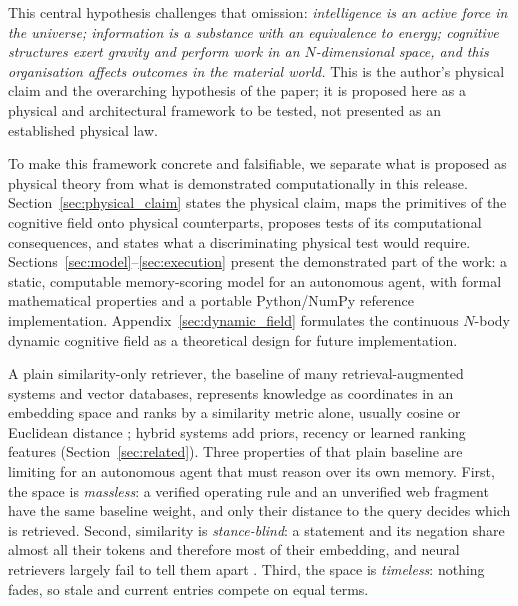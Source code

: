 \documentclass[11pt]{article}
\theoremstyle{remark}
\begin{document}
This central hypothesis challenges that omission: \emph{intelligence is an active force in the universe; information is a substance with an equivalence to energy; cognitive structures exert gravity and perform work in an $N$-dimensional space, and this organisation affects outcomes in the material world.} This is the author's physical claim and the overarching hypothesis of the paper; it is proposed here as a physical and architectural framework to be tested, not presented as an established physical law.

To make this framework concrete and falsifiable, we separate what is proposed as physical theory from what is demonstrated computationally in this release. Section~\ref{sec:physical_claim} states the physical claim, maps the primitives of the cognitive field onto physical counterparts, proposes tests of its computational consequences, and states what a discriminating physical test would require. Sections~\ref{sec:model}--\ref{sec:execution} present the demonstrated part of the work: a static, computable memory-scoring model for an autonomous agent, with formal mathematical properties and a portable Python/NumPy reference implementation. Appendix~\ref{sec:dynamic_field} formulates the continuous $N$-body dynamic cognitive field as a theoretical design for future implementation.

A plain similarity-only retriever, the baseline of many retrieval-augmented systems and vector databases, represents knowledge as coordinates in an embedding space and ranks by a similarity metric alone, usually cosine or Euclidean distance \citep{reimers2019sbert,karpukhin2020dpr}; hybrid systems add priors, recency or learned ranking features (Section~\ref{sec:related}). Three properties of that plain baseline are limiting for an autonomous agent that must reason over its own memory. First, the space is \emph{massless}: a verified operating rule and an unverified web fragment have the same baseline weight, and only their distance to the query decides which is retrieved. Second, similarity is \emph{stance-blind}: a statement and its negation share almost all their tokens and therefore most of their embedding, and neural retrievers largely fail to tell them apart \citep{weller2024nevir}. Third, the space is \emph{timeless}: nothing fades, so stale and current entries compete on equal terms.
\end{document}
